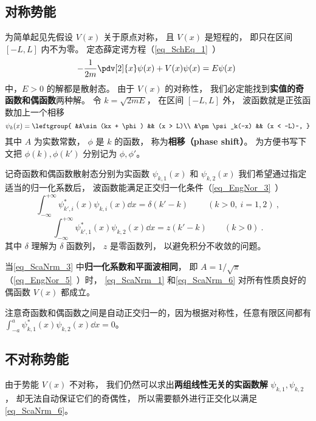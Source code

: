 \subsection{对称势能}
为简单起见先假设 $V(x)$ 关于原点对称， 且 $V(x)$ 是短程的， 即只在区间 $[-L,L]$ 内不为零。 定态薛定谔方程（\autoref{eq_SchEq_1}~）
\begin{equation}
-\frac{1}{2m}\pdv[2]{x}\psi(x) + V(x)\psi(x) = E\psi(x)~
\end{equation}
中，$E > 0$ 的解都是散射态。 由于 $V(x)$ 的对称性， 我们必定能找到\textbf{实值的奇函数和偶函数}两种解。 令 $k = \sqrt{2mE}$， 在区间 $[-L,L]$ 外， 波函数就是正弦函数加上一个相移
\begin{equation}\label{eq_ScaNrm_3}
\psi_k(x) = \leftgroup{
&A\sin(kx + \phi) && (x > L)\\
&\pm \psi_k(-x) && (x < -L)~,
}\end{equation}
其中 $A$ 为实数常数， $\phi$ 是 $k$ 的函数， 称为\textbf{相移（phase shift）}。 为方便书写下文把 $\phi(k),\phi(k')$ 分别记为 $\phi, \phi'$。

记奇函数和偶函数散射态分别为实函数 $\psi_{k,1}(x)$ 和 $\psi_{k,2}(x)$ 我们希望通过指定适当的归一化系数后， 波函数能满足正交归一化条件（\autoref{eq_EngNor_3}~）
\begin{equation}\label{eq_ScaNrm_1}
\int_{-\infty}^{+\infty} \psi_{k',i}^*(x) \psi_{k,i}(x) \dd{x} = \delta(k' - k)~\qquad (k > 0,\ i = 1, 2)~,
\end{equation}
\begin{equation}\label{eq_ScaNrm_6}
\int_{-\infty}^{+\infty} \psi_{k',1}^*(x) \psi_{k,2}(x) \dd{x} = z(k' - k) \qquad (k > 0)~.
\end{equation}
其中 $\delta$ 理解为 $\delta$ 函数列， $z$ 是零函数列， 以避免积分不收敛的问题。

\begin{theorem}{}\label{the_ScaNrm_1}
当\autoref{eq_ScaNrm_3} 中\textbf{归一化系数和平面波相同}， 即 $A = 1/\sqrt{\pi}$（\autoref{eq_EngNor_5}~）时， \autoref{eq_ScaNrm_1} 和\autoref{eq_ScaNrm_6} 对所有性质良好的偶函数 $V(x)$ 都成立。
\end{theorem}
注意奇函数和偶函数之间是自动正交归一的，因为根据对称性，任意有限区间都有 $\int_{-a}^{a} \psi_{k,1}^*(x) \psi_{k,2}(x) \dd{x} = 0$。

\subsection{不对称势能}
由于势能 $V(x)$ 不对称， 我们仍然可以求出\textbf{两组线性无关的实函数解} $\psi_{k,1},\psi_{k,2}$， 却无法自动保证它们的奇偶性， 所以需要额外进行正交化以满足\autoref{eq_ScaNrm_6}。

